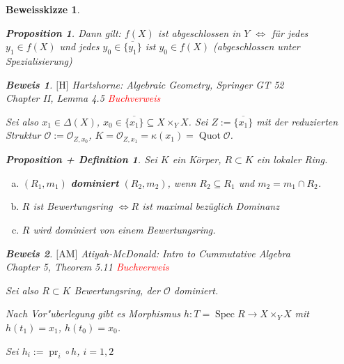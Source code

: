 \documentclass[paper = A4, fontsize=12pt, numbers=noendperiod, chapterprefix=true]{scrbook}
\theoremstyle{break}
\newtheorem{Prop}[Def]{Proposition}
\newtheorem{PropDef}[Def]{Proposition + Definition}
\theoremstyle{nonumberbreak}
\newtheorem{bew}{Beweis}
\newtheorem{bewskiz}{Beweisskizze}
\theoremstyle{nonumberplain}
\newcommand{\quot}[1]{\textrm{\glqq}{#1}\textrm{\grqq}}
\newcommand{\emp}[1]{\textbf{\emph{#1}}}
\newcommand{\deftermspec}[2]{{\index{#2}}\emp{#1}}
\newenvironment{twosidedproof}{\begin{enumerate}[\quot{$\Rightarrow$}:]}{\end{enumerate}}
\DeclareMathOperator{\Quot}{Quot}
\DeclareMathOperator{\Spec}{Spec}
\DeclareMathOperator{\pr}{pr}
\newcommand{\calO}{\mathcal{O}}
\newcommand{\X}{\times}
\begin{document}
\begin{bewskiz}
\begin{enumerate}[I)]
\begin{twosidedproof}
\begin{Prop}
		Dann gilt: $f(X)$ ist abgeschlossen in $Y$ $\Leftrightarrow$ f\"ur jedes $y_1 \in f(X)$ und jedes $y_0 \in \overline{\{y_1\}}$ ist $y_0 \in f(X)$ (\quot{abgeschlossen unter Spezialisierung})
		\end{Prop}
		\begin{bew}
		$\text{[H]}$ Hartshorne: Algebraic Geometry, Springer GT 52\\
		Chapter II, Lemma 4.5
		\textcolor{red}{Buchverweis}
		\end{bew}
		Sei also $x_1 \in \Delta(X)$, $x_0 \in \overline{\{x_1\}} \subseteq X \X_Y X$. Sei $Z := \overline{\{x_1\}}$ mit der reduzierten Struktur $\calO := \calO_{Z, x_0}$, $K = \calO_{Z, x_1} = \kappa(x_1) = \Quot \calO$.
		\begin{PropDef}\label{8.8}
		Sei $K$ ein K\"orper, $R \subset K$ ein lokaler Ring.\begin{enumerate}[a)]
		\item
			$(R_1,m_1)$ \deftermspec{dominiert}{dominieren} $(R_2,m_2)$, wenn $R_2 \subseteq R_1$ und $m_2 = m_1 \cap R_2$.
		\item
			$R$ ist Bewertungsring $\Leftrightarrow R$ ist maximal bez\"uglich Dominanz
		\item
			$R$ wird dominiert von einem Bewertungsring.
		\end{enumerate}\end{PropDef}
		\begin{bew}
		$\text{[AM]}$ Atiyah-McDonald: Intro to Cummutative Algebra\\
		Chapter 5, Theorem 5.11
		\textcolor{red}{Buchverweis}
		\end{bew}
		Sei also $R \subset K$ Bewertungsring, der $\calO$ dominiert.
		
		Nach Vor"uberlegung gibt es Morphismus $h: T = \Spec R \to X \X_Y X$ mit $h(t_1) = x_1$, $h(t_0) = x_0$.
		
		Sei $h_i := \pr_i \circ h$, $i=1,2$
		\begin{center}
\end{center}
\end{twosidedproof}
\end{enumerate}
\end{bewskiz}
\end{document}
